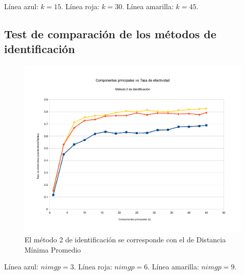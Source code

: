 Línea azul: $k = 15$. Línea roja: $k = 30$. Línea amarilla: $k = 45$.

\subsection{Test de comparación de los métodos de identificación}
\begin{figure}[H]{}
\centering
\includegraphics[scale=0.5]{graphs/componentesPrincipalesVsTasaDeEfectividadM2.pdf}
\caption{El método 2 de identificación se corresponde con el de Distancia Mínima Promedio}
\label{CPvsTE}
\end{figure}

Línea azul: $nimgp = 3$. Línea roja: $nimgp = 6$. Línea amarilla: $nimgp = 9$.